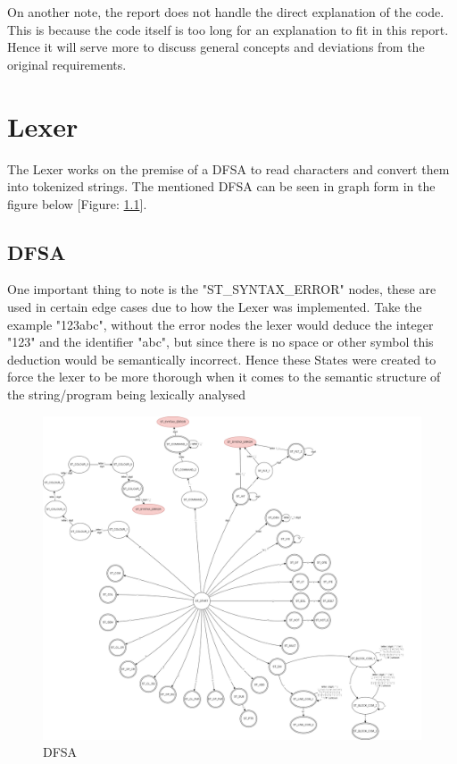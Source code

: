 \documentclass[12pt, a4paper]{report}
\begin{document}
On another note, the report does not handle the direct explanation of the code. This is because the code itself is too long for an explanation to fit in this report. Hence it will serve more to discuss general concepts and deviations from the original requirements.


\chapter{Lexer}

The Lexer works on the premise of a DFSA to read characters and convert them into tokenized strings. The mentioned DFSA can be seen in graph form in the figure below [Figure: \ref{DFSA}].

\section{DFSA} 
One important thing to note is the "ST\_SYNTAX\_ERROR" nodes, these are used in certain edge cases due to how the Lexer was implemented. Take the example "123abc", without the error nodes the lexer would deduce the integer "123" and the identifier "abc", but since there is no space or other symbol this deduction would be semantically incorrect. Hence these States were created to force the lexer to be more thorough when it comes to the semantic structure of the string/program being lexically analysed

\begin{figure}[!htp]
    \centering
    \includegraphics[width=15cm]{DFSA.png}
    \caption{DFSA}
    \label{DFSA}
\end{figure}
\end{document}
